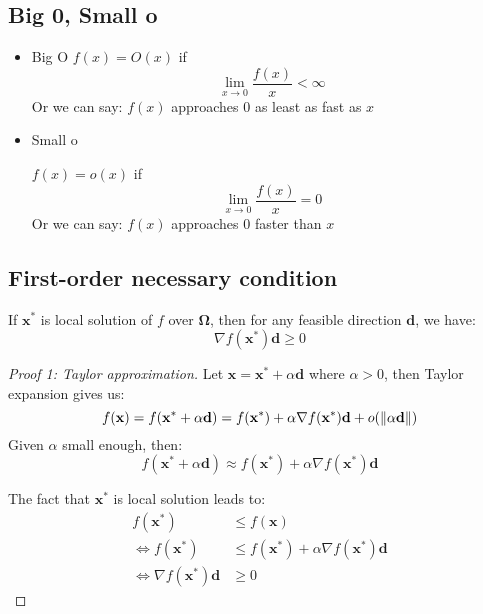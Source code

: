 \documentclass[11pt,a4paper]{article}
\begin{document}
\subsection{Big 0, Small o}%
\label{sub:big_0_small_o}
\begin{itemize}
    \item Big O
$f(x) = O(x)$ if 
\[
    \lim_{x \to 0} \frac{f(x)}{x} < \infty
\] 
Or we can say: $f(x)$ approaches 0 as least as fast as $x$
\item Small o

$f(x) = o(x)$ if 
\[
    \lim_{x \to 0} \frac{f(x)}{x} = 0
\] 
Or we can say: $f(x)$ approaches 0 faster than $x$
\end{itemize}


\subsection{First-order necessary condition}%
\label{sub:first_order_necessary_condition}
\begin{lemma}
    If $\mathbf{x}^{*}$ is local solution of $f$ over $\boldsymbol\Omega$, then for any feasible direction $\mathbf{d}$, we have:
    \[
        \nabla f(\mathbf{x}^{*}) \mathbf{d} \geq 0
    \] 
\end{lemma}

\begin{proof}[Proof 1: Taylor approximation]
    Let $\mathbf{x}=\mathbf{x}^{*} + \alpha \mathbf{d}$ where $\alpha > 0$, then Taylor expansion gives us:
    \[
        f(\mathbf{x}) = f(\mathbf{x}^{*} + \alpha \mathbf{d}) = f(\mathbf{x}^{*}) + \alpha \nabla f(\mathbf{x}^{*})\mathbf{d} + o(\left\lVert\alpha \mathbf{d}\right\rVert)
    \] 
    Given $\alpha$ small enough, then:
    \[
        f(\mathbf{x}^{*} + \alpha \mathbf{d}) \approx f(\mathbf{x}^{*}) + \alpha \nabla f(\mathbf{x}^{*})\mathbf{d}     \] 

        The fact that $\mathbf{x}^{*}$ is local solution leads to:
        \begin{align*}
            f(\mathbf{x}^{*}) &\leq f(\mathbf{x}) \\
            \Leftrightarrow f(\mathbf{x}^{*}) &\leq f(\mathbf{x}^{*}) + \alpha \nabla f(\mathbf{x}^{*})\mathbf{d}  \\
            \Leftrightarrow \nabla f(\mathbf{x}^{*})\mathbf{d} &\geq 0
        \end{align*}
\end{proof}
\end{document}
